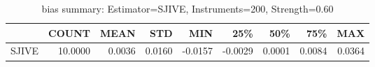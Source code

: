 \begin{table}[ht]
\centering
\caption{bias summary: Estimator=SJIVE, Instruments=200, Strength=0.60}
\begin{tabular}{lrrrrrrrr}
\toprule
 & COUNT & MEAN & STD & MIN & 25\% & 50\% & 75\% & MAX \\
\midrule
SJIVE & 10.0000 & 0.0036 & 0.0160 & -0.0157 & -0.0029 & 0.0001 & 0.0084 & 0.0364 \\
\bottomrule
\end{tabular}
\end{table}
